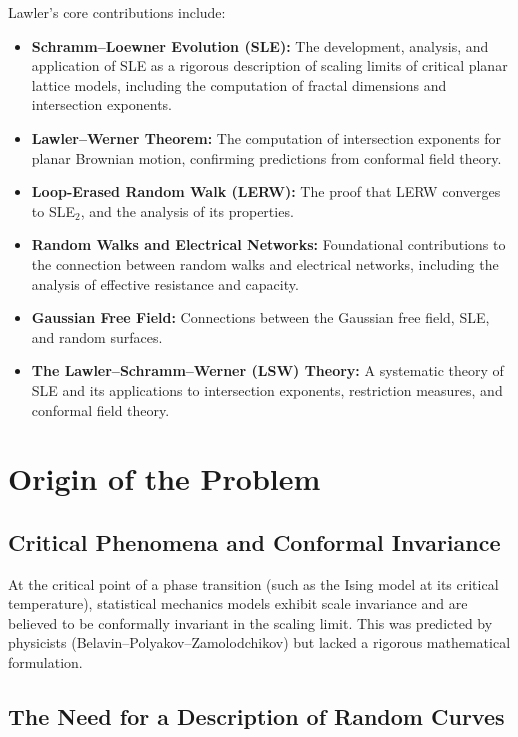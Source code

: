 Lawler's core contributions include:
\begin{itemize}
    \item \textbf{Schramm--Loewner Evolution (SLE):} The development, analysis, and application of SLE as a rigorous description of scaling limits of critical planar lattice models, including the computation of fractal dimensions and intersection exponents.
    \item \textbf{Lawler--Werner Theorem:} The computation of intersection exponents for planar Brownian motion, confirming predictions from conformal field theory.
    \item \textbf{Loop-Erased Random Walk (LERW):} The proof that LERW converges to SLE$_2$, and the analysis of its properties.
    \item \textbf{Random Walks and Electrical Networks:} Foundational contributions to the connection between random walks and electrical networks, including the analysis of effective resistance and capacity.
    \item \textbf{Gaussian Free Field:} Connections between the Gaussian free field, SLE, and random surfaces.
    \item \textbf{The Lawler--Schramm--Werner (LSW) Theory:} A systematic theory of SLE and its applications to intersection exponents, restriction measures, and conformal field theory.
\end{itemize}

\section{Origin of the Problem}

\subsection{Critical Phenomena and Conformal Invariance}

At the critical point of a phase transition (such as the Ising model at its critical temperature), statistical mechanics models exhibit scale invariance and are believed to be conformally invariant in the scaling limit. This was predicted by physicists (Belavin--Polyakov--Zamolodchikov) but lacked a rigorous mathematical formulation.

\subsection{The Need for a Description of Random Curves}

